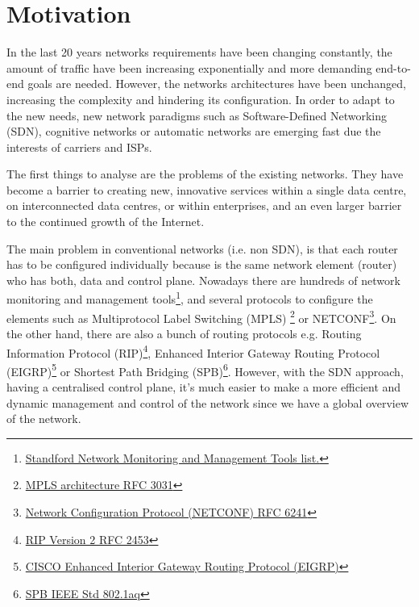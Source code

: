 \section{Motivation}
\label{sec:motivation}

In the last 20 years networks requirements have been changing constantly, the amount of traffic have been increasing exponentially and more demanding end-to-end goals are needed. However, the networks architectures have been unchanged, increasing the complexity and hindering its configuration. In order to adapt to the new needs, new network paradigms such as Software-Defined Networking (SDN), cognitive networks or automatic networks are emerging fast due the interests of carriers and ISPs.

The first things to analyse are the problems of the existing networks. They have become a barrier to creating new, innovative services within a single data centre, on interconnected data centres, or within enterprises, and an even larger barrier to the continued growth of the Internet.

The main problem in conventional networks (i.e. non SDN), is that each router has to be configured individually because is the same network element (router) who has both, data and control plane. Nowadays there are hundreds of network monitoring and management tools\footnote{\href{http://www.slac.stanford.edu/xorg/nmtf/nmtf-tools.html}{Standford Network Monitoring and Management Tools list.}}, and several protocols to configure the elements such as Multiprotocol Label Switching (MPLS) \footnote{\href{http://www.ietf.org/rfc/rfc3031.txt}{MPLS architecture RFC 3031}} or NETCONF\footnote{\href{http://tools.ietf.org/html/rfc6241}{Network Configuration Protocol (NETCONF) RFC 6241}}. On the other hand, there are also a bunch of routing protocols e.g. Routing Information Protocol (RIP)\footnote{\href{http://tools.ietf.org/html/rfc2453}{RIP Version 2 RFC 2453}}, Enhanced Interior Gateway Routing Protocol (EIGRP)\footnote{\href{http://www.cisco.com/c/en/us/products/ios-nx-os-software/enhanced-interior-gateway-routing-protocol-eigrp/index.html}{CISCO Enhanced Interior Gateway Routing Protocol (EIGRP)}} or Shortest Path Bridging (SPB)\footnote{\href{http://standards.ieee.org/getieee802/download/802.1aq-2012.pdf}{SPB IEEE Std 802.1aq}}. However, with the SDN approach, having a centralised control plane, it's much easier to make a more efficient and dynamic management and control of the network since we have a global overview of the network.

